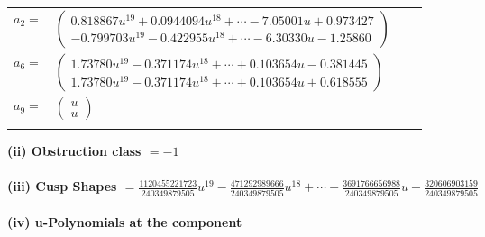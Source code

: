 \documentclass[1p]{elsarticle_modified}
\theoremstyle{definition}
\begin{document}
\begin{tabular}{m{7pt} m{180pt} m{7pt} m{180pt} }
\flushright $a_{2}=$&$\begin{pmatrix}0.818867 u^{19}+0.0944094 u^{18}+\cdots-7.05001 u+0.973427\\-0.799703 u^{19}-0.422955 u^{18}+\cdots-6.30330 u-1.25860\end{pmatrix}$ \\
\flushright $a_{6}=$&$\begin{pmatrix}1.73780 u^{19}-0.371174 u^{18}+\cdots+0.103654 u-0.381445\\1.73780 u^{19}-0.371174 u^{18}+\cdots+0.103654 u+0.618555\end{pmatrix}$ \\
\flushright $a_{9}=$&$\begin{pmatrix}u\\u\end{pmatrix}$\\&\end{tabular}
\flushleft \textbf{(ii) Obstruction class $= -1$}\\~\\
\flushleft \textbf{(iii) Cusp Shapes $= \frac{1120455221723}{240349879505} u^{19}-\frac{471292989666}{240349879505} u^{18}+\cdots+\frac{3691766656988}{240349879505} u+\frac{320606903159}{240349879505}$}\\~\\
\newpage\renewcommand{\arraystretch}{1}
\flushleft \textbf{(iv) u-Polynomials at the component}\newline \\
\end{document}
